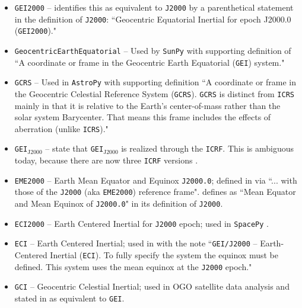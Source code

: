 \documentclass[draft]{agujournal2019}
\begin{document}
\begin{itemize}

    \item \texttt{GEI2000} --  identifies this as equivalent to \texttt{J2000} by a parenthetical statement in the definition of \texttt{J2000}: ``Geocentric Equatorial Inertial for epoch J2000.0 (\texttt{GEI2000})."

    \item \texttt{GeocentricEarthEquatorial} -- Used by \texttt{SunPy} \cite{SunPy} with supporting definition of ``A coordinate or frame in the Geocentric Earth Equatorial (\texttt{GEI}) system."
    
    \item \texttt{GCRS} --  Used in \texttt{AstroPy} \cite{AstroPy2022} with supporting definition ``A coordinate or frame in the Geocentric Celestial Reference System (\texttt{GCRS}). \texttt{GCRS} is distinct from \texttt{ICRS} mainly in that it is relative to the Earth’s center-of-mass rather than the solar system Barycenter. That means this frame includes the effects of aberration (unlike \texttt{ICRS})."

    \item \texttt{GEI}$_\mathrm{J2000}$ --  state that \texttt{GEI}$_\mathrm{J2000}$ is realized through the \texttt{ICRF}. This is ambiguous today, because there are now three \texttt{ICRF} versions \cite{Charlot2020}.

    \item \texttt{EME2000} -- Earth Mean Equator and Equinox \texttt{J2000.0}; defined in  via ``... with those of the \texttt{J2000} (aka \texttt{EME2000}) reference frame".  defines as ``Mean Equator and Mean Equinox of \texttt{J2000.0}" in its definition of \texttt{J2000}.

    \item \texttt{ECI2000} -- Earth Centered Inertial for \texttt{J2000} epoch; used in \texttt{SpacePy} \cite{Niehof2022}.

    \item \texttt{ECI} -- Earth Centered Inertial; used in  with the note ``\texttt{GEI/J2000} – Earth-Centered Inertial (\texttt{ECI}). To fully specify the system the equinox must be defined. This system uses the mean equinox at the \texttt{J2000} epoch."
    
    
   \item \texttt{GCI} -- Geocentric Celestial Inertial; used in OGO satellite data analysis \cite{NASA1970} and stated in  as equivalent to \texttt{GEI}.


\end{itemize}
\end{document}
